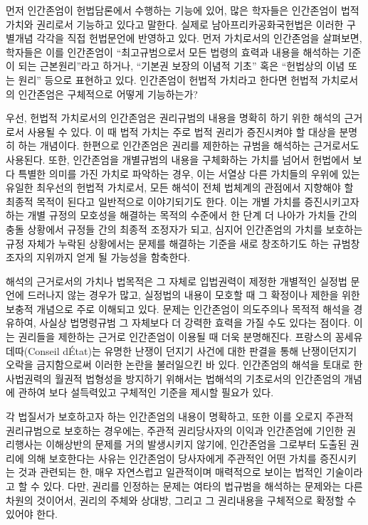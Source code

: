 먼저 인간존엄이 헌법담론에서 수행하는 기능에 있어, 많은 학자들은 인간존엄이 법적 가치와 권리로서 기능하고 있다고 말한다. 실제로 남아프리카공화국헌법은 이러한 구별개념 각각을 직접 헌법문언에 반영하고 있다. 먼저 가치로서의 인간존엄을 살펴보면, 학자들은 이를 인간존엄이 ``최고규범으로서 모든 법령의 효력과 내용을 해석하는 기준이 되는 근본원리''라고 하거나, ``기본권 보장의 이념적 기초'' 혹은 ``헌법상의 이념 또는 원리'' 등으로 표현하고 있다. 인간존엄이 헌법적 가치라고 한다면 헌법적 가치로서의 인간존엄은 구체적으로 어떻게 기능하는가?

우선, 헌법적 가치로서의 인간존엄은 권리규범의 내용을 명확히 하기 위한 해석의 근거로서 사용될 수 있다. 이 때 법적 가치는 주로 법적 권리가 증진시켜야 할 대상을 분명히 하는 개념이다. 한편으로 인간존엄은 권리를 제한하는 규범을 해석하는 근거로서도 사용된다. 또한, 인간존엄을 개별규범의 내용을 구체화하는 가치를 넘어서 헌법에서 보다 특별한 의미를 가진 가치로 파악하는 경우, 이는 서열상 다른 가치들의 우위에 있는 유일한 최우선의 헌법적 가치로서, 모든 해석이 전체 법체계의 관점에서 지향해야 할 최종적 목적이 된다고 일반적으로 이야기되기도 한다. 이는 개별 가치를 증진시키고자 하는 개별 규정의 모호성을 해결하는 목적의 수준에서 한 단계 더 나아가 가치들 간의 충돌 상황에서 규정들 간의 최종적 조정자가 되고, 심지어 인간존엄의 가치를 보호하는 규정 자체가 누락된 상황에서는 문제를 해결하는 기준을 새로 창조하기도 하는 규범창조자의 지위까지 얻게 될 가능성을 함축한다.

해석의 근거로서의 가치나 법목적은 그 자체로 입법권력이 제정한 개별적인 실정법 문언에 드러나지 않는 경우가 많고, 실정법의 내용이 모호할 때 그 확정이나 제한을 위한 보충적 개념으로 주로 이해되고 있다. 문제는 인간존엄이 의도주의나 목적적 해석을 경유하여, 사실상 법명령규범 그 자체보다 더 강력한 효력을 가질 수도 있다는 점이다. 이는 권리들을 제한하는 근거로 인간존엄이 이용될 때 더욱 분명해진다. 프랑스의 꽁세유데따(Conseil d\textquotesingle État)는 유명한 난쟁이 던지기 사건에 대한 판결을 통해 난쟁이던지기 오락을 금지함으로써 이러한 논란을 불러일으킨 바 있다. 인간존엄의 해석을 토대로 한 사법권력의 월권적 법형성을 방지하기 위해서는 법해석의 기초로서의 인간존엄의 개념에 관하여 보다 설득력있고 구체적인 기준을 제시할 필요가 있다.

각 법질서가 보호하고자 하는 인간존엄의 내용이 명확하고, 또한 이를 오로지 주관적 권리규범으로 보호하는 경우에는, 주관적 권리당사자의 이익과 인간존엄에 기인한 권리행사는 이해상반의 문제를 거의 발생시키지 않기에, 인간존엄을 그로부터 도출된 권리에 의해 보호한다는 사유는 인간존엄이 당사자에게 주관적인 어떤 가치를 증진시키는 것과 관련되는 한, 매우 자연스럽고 일관적이며 매력적으로 보이는 법적인 기술이라고 할 수 있다. 다만, 권리를 인정하는 문제는 여타의 법규범을 해석하는 문제와는 다른 차원의 것이어서, 권리의 주체와 상대방, 그리고 그 권리내용을 구체적으로 확정할 수 있어야 한다.

